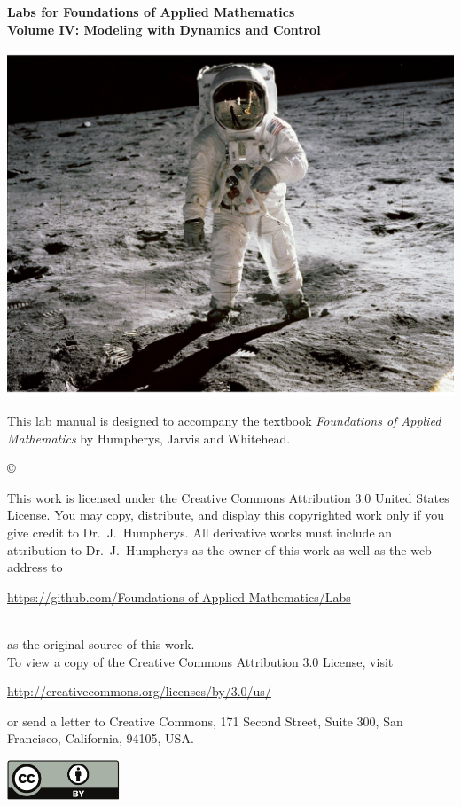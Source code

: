 \documentclass[nociteref]{SIAM-GH-book}
\begin{document}

\thispagestyle{empty} %

\begin{center}
{\huge \bf Labs for Foundations of Applied Mathematics} \\
\vspace{5mm}
{\Large \bf Volume IV: Modeling with Dynamics and Control}
\vspace{20mm}

\includegraphics[scale=.5]{Cover.pdf}
\end{center}
\frontmatter



\begin{thepreface} %

This lab manual is designed to accompany the textbook \emph{Foundations of Applied Mathematics} by Humpherys, Jarvis and Whitehead.

\vfill
\copyright{This work is licensed under the Creative Commons Attribution 3.0 United States
License.  You may copy, distribute, and display this copyrighted work only if you give
credit to Dr.~J.~Humpherys. All derivative works must include an attribution to Dr.~J.~Humpherys as the owner of this work as well as the web address to
\\\centerline{\url{https://github.com/Foundations-of-Applied-Mathematics/Labs}}\\as the original source of this work.
\\To view a copy of the Creative Commons Attribution 3.0 License, visit
\\\centerline{\url{http://creativecommons.org/licenses/by/3.0/us/}} or send a letter to Creative Commons, 171 Second Street, Suite 300, San Francisco, California, 94105, USA.}

\vfill
\centering\includegraphics[height=1.2cm]{by.pdf}
\vfill
\end{thepreface}
\end{document}
